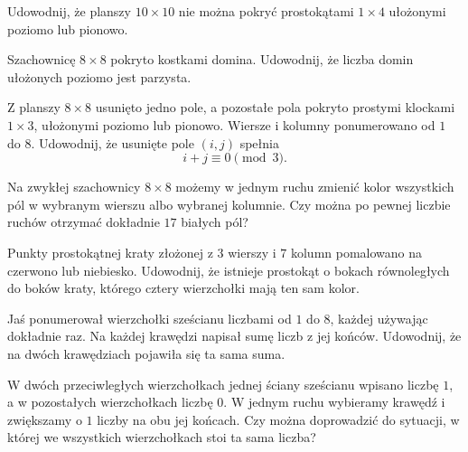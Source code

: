 \documentclass{lecture-kuznia}
\begin{document}
\begin{problem}\label{Z2}
	Udowodnij, że planszy $10\times10$ nie można pokryć prostokątami
	$1\times4$ ułożonymi poziomo lub pionowo.
\end{problem}

\begin{problem}\label{Z3}
	Szachownicę $8\times8$ pokryto kostkami domina. Udowodnij, że liczba
	domin ułożonych poziomo jest parzysta.
\end{problem}

\begin{problem}[$\clubsuit$]\label{Z4}
	Z planszy $8\times8$ usunięto jedno pole, a pozostałe pola pokryto prostymi
	klockami $1\times3$, ułożonymi poziomo lub pionowo. Wiersze i kolumny
	ponumerowano od $1$ do $8$. Udowodnij, że usunięte pole $(i,j)$ spełnia
	\[
		i+j\equiv0\pmod3.
	\]
\end{problem}

\begin{problem}\label{Z5}
	Na zwykłej szachownicy $8\times8$ możemy w jednym ruchu zmienić kolor
	wszystkich pól w wybranym wierszu albo wybranej kolumnie. Czy można po
	pewnej liczbie ruchów otrzymać dokładnie $17$ białych pól?
\end{problem}

\begin{problem}[$\diamondsuit$]\label{Z6}
	Punkty prostokątnej kraty złożonej z $3$ wierszy i $7$ kolumn pomalowano
	na czerwono lub niebiesko. Udowodnij, że istnieje prostokąt o bokach
	równoległych do boków kraty, którego cztery wierzchołki mają ten sam kolor.
\end{problem}

\begin{problem}[$\diamondsuit$]\label{Z7}
	Jaś ponumerował wierzchołki sześcianu liczbami od $1$ do $8$, każdej
	używając dokładnie raz. Na każdej krawędzi napisał sumę liczb z jej
	końców. Udowodnij, że na dwóch krawędziach pojawiła się ta sama suma.
\end{problem}

\begin{problem}[$\redheart$]\label{Z8}
	W dwóch przeciwległych wierzchołkach jednej ściany sześcianu wpisano
	liczbę $1$, a w pozostałych wierzchołkach liczbę $0$. W jednym ruchu
	wybieramy krawędź i zwiększamy o $1$ liczby na obu jej końcach. Czy można
	doprowadzić do sytuacji, w której we wszystkich wierzchołkach stoi ta sama
	liczba?
\end{problem}
\end{document}
